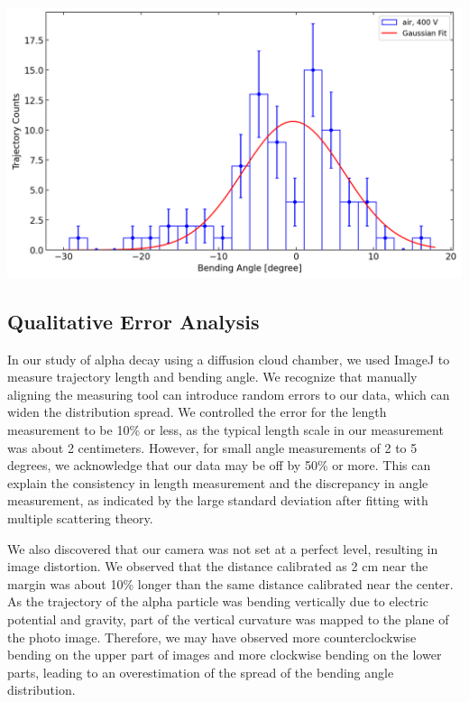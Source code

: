 \documentclass[a4paper]{tufte-handout}
\begin{document}
\\
\includegraphics[width = 1\textwidth]{figures/result_scat.png}
\\

\subsection{Qualitative Error Analysis}

In our study of alpha decay using a diffusion cloud chamber, we used ImageJ to measure trajectory length and bending angle. We recognize that manually aligning the measuring tool can introduce random errors to our data, which can widen the distribution spread. We controlled the error for the length measurement to be 10\% or less, as the typical length scale in our measurement was about 2 centimeters. However, for small angle measurements of 2 to 5 degrees, we acknowledge that our data may be off by 50\% or more. This can explain the consistency in length measurement and the discrepancy in angle measurement, as indicated by the large standard deviation after fitting with multiple scattering theory.

We also discovered that our camera was not set at a perfect level, resulting in image distortion. We observed that the distance calibrated as 2 cm near the margin was about 10\% longer than the same distance calibrated near the center. As the trajectory of the alpha particle was bending vertically due to electric potential and gravity, part of the vertical curvature was mapped to the plane of the photo image. Therefore, we may have observed more counterclockwise bending on the upper part of images and more clockwise bending on the lower parts, leading to an overestimation of the spread of the bending angle distribution.
\end{document}
